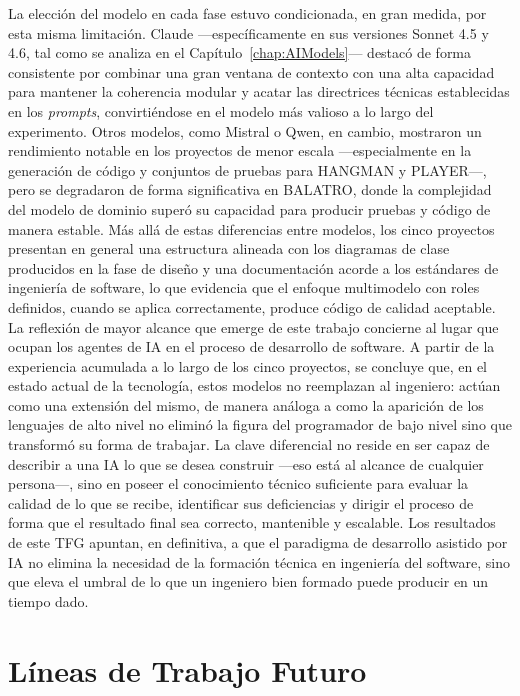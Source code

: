 La elección del modelo en cada fase estuvo condicionada, en gran medida, por esta misma limitación. Claude ---específicamente en sus versiones Sonnet 4.5 y 4.6, tal como se analiza en el Capítulo~\ref{chap:AIModels}--- destacó de forma consistente por combinar una gran ventana de contexto con una alta capacidad para mantener la coherencia modular y acatar las directrices técnicas establecidas en los \textit{prompts}, convirtiéndose en el modelo más valioso a lo largo del experimento. Otros modelos, como Mistral o Qwen, en cambio, mostraron un rendimiento notable en los proyectos de menor escala ---especialmente en la generación de código y conjuntos de pruebas para \ac{HANGMAN} y \ac{PLAYER}---, pero se degradaron de forma significativa en \ac{BALATRO}, donde la complejidad del modelo de dominio superó su capacidad para producir pruebas y código de manera estable. Más allá de estas diferencias entre modelos, los cinco proyectos presentan en general una estructura alineada con los diagramas de clase producidos en la fase de diseño y una documentación acorde a los estándares de ingeniería de software, lo que evidencia que el enfoque multimodelo con roles definidos, cuando se aplica correctamente, produce código de calidad aceptable.\\

La reflexión de mayor alcance que emerge de este trabajo concierne al lugar que ocupan los agentes de \ac{IA} en el proceso de desarrollo de software. A partir de la experiencia acumulada a lo largo de los cinco proyectos, se concluye que, en el estado actual de la tecnología, estos modelos no reemplazan al ingeniero: actúan como una extensión del mismo, de manera análoga a como la aparición de los lenguajes de alto nivel no eliminó la figura del programador de bajo nivel sino que transformó su forma de trabajar. La clave diferencial no reside en ser capaz de describir a una \ac{IA} lo que se desea construir ---eso está al alcance de cualquier persona---, sino en poseer el conocimiento técnico suficiente para evaluar la calidad de lo que se recibe, identificar sus deficiencias y dirigir el proceso de forma que el resultado final sea correcto, mantenible y escalable. Los resultados de este \ac{TFG} apuntan, en definitiva, a que el paradigma de desarrollo asistido por \ac{IA} no elimina la necesidad de la formación técnica en ingeniería del software, sino que eleva el umbral de lo que un ingeniero bien formado puede producir en un tiempo dado.

\section{Líneas de Trabajo Futuro} \label{sec:trabajo-futuro}

